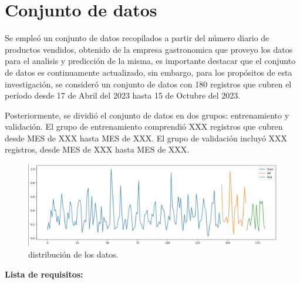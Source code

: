 \section{Conjunto de datos}
Se  empleó  un  conjunto  de  datos  recopilados  a  partir  del  número  diario  de  productos vendidos,  obtenido  de la empresa gastronomica que proveyo los datos para el analisis y predicción de la misma, es importante destacar que el conjunto de datos es continuamente actualizado, sin embargo, para los propósitos de esta investigación, se consideró un conjunto de datos con 180 registros que cubren el período desde 17 de Abril del 2023 hasta 15 de Octubre del 2023.

Posteriormente, se dividió el conjunto de datos en dos grupos: entrenamiento y validación. El grupo de entrenamiento comprendió XXX registros que cubren desde MES de XXX hasta MES de XXX. El grupo de validación incluyó XXX registros, desde MES de XXX hasta MES de XXX.

\begin{figure}[H]
  \begin{center}
    \includegraphics[scale=0.40]{./ditribucion_de_datos.jpg}
    \caption{distribución de los datos.}
    \label{fig:distribucion_datos}
  \end{center}
\end{figure}

\textbf{Lista de requisitos:}

